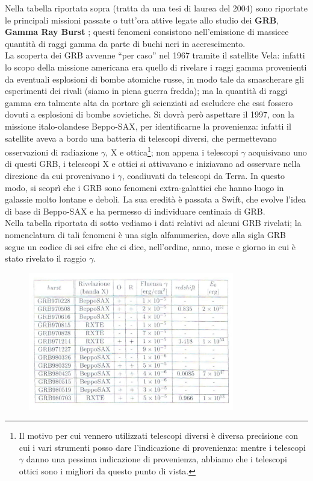 Nella tabella riportata sopra (tratta da una tesi di laurea del 2004) sono riportate le principali missioni passate o tutt'ora attive legate allo studio dei \textbf{GRB}, \textbf{Gamma Ray Burst} ; questi fenomeni consistono nell'emissione di massicce quantità di raggi gamma da parte di buchi neri in accrescimento.\\
La scoperta dei GRB avvenne ``per caso'' nel 1967 tramite il satellite Vela: infatti lo scopo della missione americana era quello di rivelare i raggi gamma provenienti da eventuali esplosioni di bombe atomiche russe, in modo tale da smascherare gli esperimenti dei rivali (siamo in piena guerra fredda); ma la quantità di raggi gamma era talmente alta da portare gli scienziati ad escludere che essi fossero dovuti a esplosioni di bombe sovietiche. Si dovrà però aspettare il 1997, con la missione italo-olandese Beppo-SAX, per identificarne la provenienza: infatti il satellite aveva a bordo una batteria di telescopi diversi, che permettevano osservazioni di radiazione $\gamma$, X e ottica\footnote{Il motivo per cui vennero utilizzati telescopi diversi è diversa precisione con cui i vari strumenti posso dare l'indicazione di provenienza: mentre i telescopi $\gamma$ danno una pessima indicazione di provenienza, abbiamo che i telescopi ottici sono i migliori da questo punto di vista.}; non appena i telescopi $\gamma$ acquisivano uno di questi GRB, i telescopi X e ottici si attivavano e iniziavano ad osservare nella direzione da cui provenivano i $\gamma$, coadiuvati da telescopi da Terra. In questo modo, si scoprì che i GRB sono fenomeni extra-galattici che hanno luogo in galassie molto lontane e deboli. La sua eredità è passata a Swift, che evolve l'idea di base di Beppo-SAX e ha permesso di individuare centinaia di GRB.
\\
Nella tabella riportata di sotto vediamo i dati relativi ad alcuni GRB rivelati; la nomenclatura di tali fenomeni è una sigla alfanumerica, dove alla sigla GRB segue un codice di sei cifre che ci dice, nell'ordine, anno, mese e giorno in cui è stato rivelato il raggio $\gamma$.

\begin{figure}[h!]
	\centering
	\includegraphics[width=0.8\textwidth]{Img/bertin_14.png}
\end{figure}

